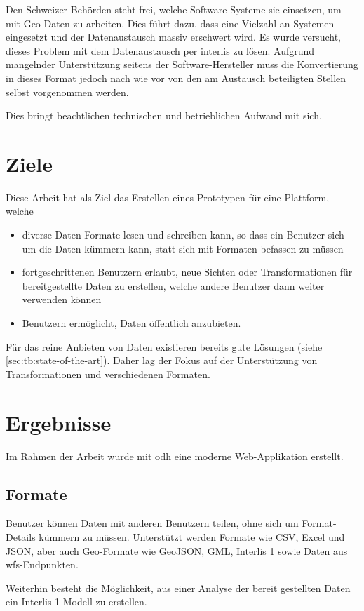 Den Schweizer Behörden steht frei, welche Software-Systeme sie einsetzen, um mit Geo-Daten zu arbeiten. Dies führt dazu, dass eine Vielzahl an Systemen eingesetzt und der Datenaustausch massiv erschwert wird. Es wurde versucht, dieses Problem mit dem Datenaustausch per \gls{interlis} zu lösen. Aufgrund mangelnder Unterstützung seitens der Software-Hersteller muss die Konvertierung in dieses Format jedoch nach wie vor von den am Austausch beteiligten Stellen selbst vorgenommen werden.

Dies bringt beachtlichen technischen und betrieblichen Aufwand mit sich.

\section*{Ziele}

Diese Arbeit hat als Ziel das Erstellen eines Prototypen für eine Plattform, welche
\begin{itemize}
\item diverse Daten-Formate lesen und schreiben kann, so dass ein Benutzer sich um die Daten kümmern kann, statt sich mit Formaten befassen zu müssen
\item fortgeschrittenen Benutzern erlaubt, neue Sichten oder Transformationen für bereitgestellte Daten zu erstellen, welche andere Benutzer dann weiter verwenden können
\item Benutzern ermöglicht, Daten öffentlich anzubieten.
\end{itemize}

Für das reine Anbieten von Daten existieren bereits gute Lösungen (siehe \cref{sec:tb:state-of-the-art}). Daher lag der Fokus auf der Unterstützung von Transformationen und verschiedenen Formaten.

\section*{Ergebnisse}
Im Rahmen der Arbeit wurde mit \acf{odh} eine moderne Web-Applikation erstellt.

\subsection*{Formate}
Benutzer können Daten mit anderen Benutzern teilen, ohne sich um Format-Details kümmern zu müssen. Unterstützt werden Formate wie CSV, Excel und JSON, aber auch Geo-Formate wie GeoJSON, GML, Interlis 1 sowie Daten aus \gls{wfs}-Endpunkten.

Weiterhin besteht die Möglichkeit, aus einer Analyse der bereit gestellten Daten ein Interlis 1-Modell zu erstellen.

